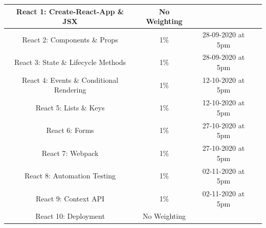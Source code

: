 \documentclass{article}
\begin{document}
\begin{tabular}{|c|c|c|c|}
	\small React 1: Create-React-App  \& JSX                          & \small No Weighting &  \\ \hline
	\small React 2:  Components \& Props                                        & \small 1\%          & \small 28-09-2020 at 5pm \\ \hline
	\small React 3: State \& Lifecycle Methods                                       & \small 1\%          & \small 28-09-2020 at 5pm \\ \hline
	\small React 4: Events \& Conditional Rendering                      & \small 1\%          & \small 12-10-2020 at 5pm \\ \hline
	\small React 5:   Lists \& Keys                                     & \small 1\%          & \small 12-10-2020 at 5pm \\ \hline
	\small React 6: Forms                          & \small 1\%          & \small 27-10-2020 at 5pm \\ \hline
	\small React 7: Webpack                           & \small 1\%          & \small 27-10-2020 at 5pm \\ \hline
	\small React 8: Automation Testing                       & \small 1\%          & \small 02-11-2020 at 5pm \\ \hline
	\small React 9:  Context API                               & \small 1\%          & \small 02-11-2020 at 5pm \\ \hline
	\small React 10: Deployment                                 & \small No Weighting         & \small  \\ \hline
\end{tabular}
\end{document}
